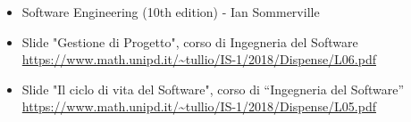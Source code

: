 \begin{itemize}
    \item Software Engineering (10th edition) - Ian Sommerville
    \item Slide "Gestione di Progetto", corso di Ingegneria del Software
          \newline \url{https://www.math.unipd.it/~tullio/IS-1/2018/Dispense/L06.pdf}
    \item Slide "Il ciclo di vita del Software", corso di “Ingegneria del Software”
          \newline \url{https://www.math.unipd.it/~tullio/IS-1/2018/Dispense/L05.pdf}
\end{itemize}